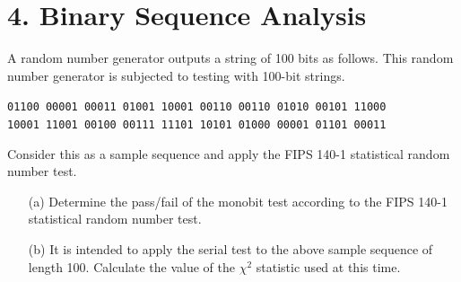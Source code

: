 \documentclass[12pt,openany]{book}
\theoremstyle{definition}
\begin{document}
\newpage
\section*{4. Binary Sequence Analysis}
A random number generator outputs a string of 100 bits as follows. This random number generator is subjected to testing with 100-bit strings.
\begin{center}
	\texttt{01100 00001 00011 01001 10001 00110 00110 01010 00101 11000}\\
	\texttt{10001 11001 00100 00111 11101 10101 01000 00001 01101 00011}
\end{center}
Consider this as a sample sequence and apply the FIPS 140-1 statistical random number test.
\begin{enumerate}
	\item[(a)] Determine the pass/fail of the monobit test according to the FIPS 140-1 statistical random number test.
	\item[(b)] It is intended to apply the serial test to the above sample sequence of length 100. Calculate the value of the $\chi^2$ statistic used at this time.
\end{enumerate}
\end{document}
